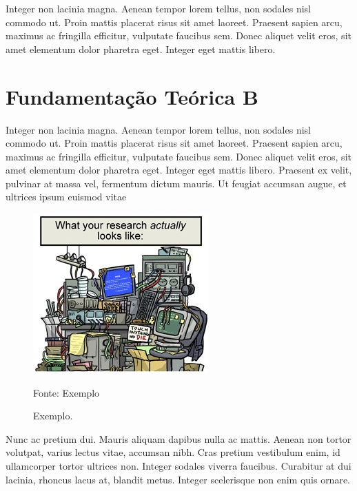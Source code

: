Integer non lacinia magna. Aenean tempor lorem tellus, non sodales nisl commodo ut. Proin mattis placerat risus sit amet laoreet. Praesent sapien arcu, maximus ac fringilla efficitur, vulputate faucibus sem. Donec aliquet velit eros, sit amet elementum dolor pharetra eget. Integer eget mattis libero.


\section{Fundamentação Teórica B}
\label{sec:fundamentacao-teorica-b}

Integer non lacinia magna. Aenean tempor lorem tellus, non sodales nisl commodo ut. Proin mattis placerat risus sit amet laoreet. Praesent sapien arcu, maximus ac fringilla efficitur, vulputate faucibus sem. Donec aliquet velit eros, sit amet elementum dolor pharetra eget. Integer eget mattis libero. Praesent ex velit, pulvinar at massa vel, fermentum dictum mauris. Ut feugiat accumsan augue, et ultrices ipsum euismod vitae

\begin{figure}[htb]
    \centering\includegraphics[width=.80\textwidth]{figuras/figura-2.jpg}
    \caption{\label{fig:exemplo-2}Exemplo.}
    
    Fonte: Exemplo%
\end{figure}

Nunc ac pretium dui. Mauris aliquam dapibus nulla ac mattis. Aenean non tortor volutpat, varius lectus vitae, accumsan nibh. Cras pretium vestibulum enim, id ullamcorper tortor ultrices non. Integer sodales viverra faucibus. Curabitur at dui lacinia, rhoncus lacus at, blandit metus. Integer scelerisque non enim quis ornare.

